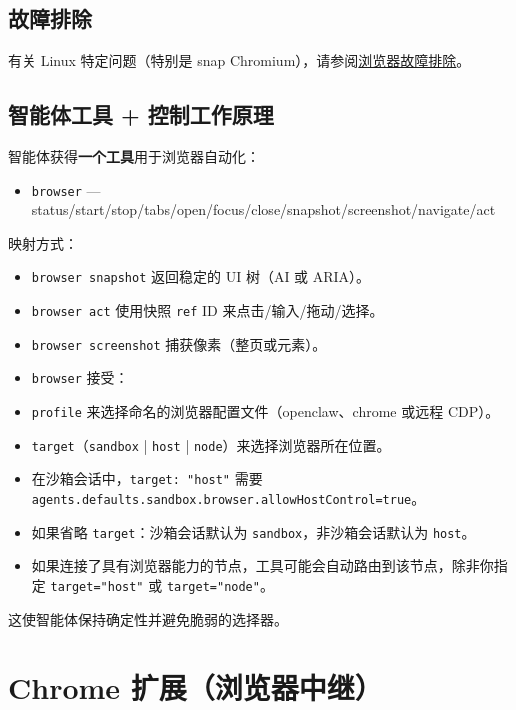 \subsection{故障排除}


有关 Linux 特定问题（特别是 snap Chromium），请参阅\href{/tools/browser-linux-troubleshooting}{浏览器故障排除}。

\subsection{智能体工具 + 控制工作原理}


智能体获得\textbf{一个工具}用于浏览器自动化：

\begin{itemize}
  \item \texttt{browser} — status/start/stop/tabs/open/focus/close/snapshot/screenshot/navigate/act
\end{itemize}


映射方式：

\begin{itemize}
  \item \texttt{browser snapshot} 返回稳定的 UI 树（AI 或 ARIA）。
  \item \texttt{browser act} 使用快照 \texttt{ref} ID 来点击/输入/拖动/选择。
  \item \texttt{browser screenshot} 捕获像素（整页或元素）。
  \item \texttt{browser} 接受：
  \item \texttt{profile} 来选择命名的浏览器配置文件（openclaw、chrome 或远程 CDP）。
  \item \texttt{target}（\texttt{sandbox} | \texttt{host} | \texttt{node}）来选择浏览器所在位置。
  \item 在沙箱会话中，\texttt{target: "host"} 需要 \texttt{agents.defaults.sandbox.browser.allowHostControl=true}。
  \item 如果省略 \texttt{target}：沙箱会话默认为 \texttt{sandbox}，非沙箱会话默认为 \texttt{host}。
  \item 如果连接了具有浏览器能力的节点，工具可能会自动路由到该节点，除非你指定 \texttt{target="host"} 或 \texttt{target="node"}。
\end{itemize}


这使智能体保持确定性并避免脆弱的选择器。


\clearpage

\section{Chrome 扩展（浏览器中继）}


